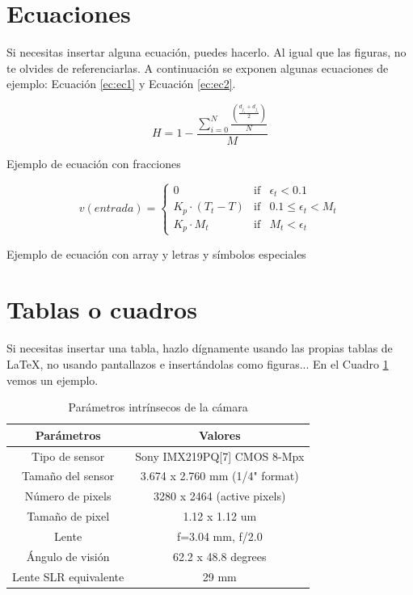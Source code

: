 \section{Ecuaciones}

Si necesitas insertar alguna ecuación, puedes hacerlo. Al igual que las figuras, no te olvides de referenciarlas. A continuación se exponen algunas ecuaciones de ejemplo: Ecuación \ref{ec:ec1} y Ecuación \ref{ec:ec2}.

\begin{myequation}[h]
\begin{equation}
H = 1 - \frac{\sum_{i=0}^{N}\frac{(\frac{d_{j_s} + d_{j_e}}{2})}{N}}{M}
\nonumber
\label{ec:ec1}
\end{equation}
\caption[Ejemplo de ecuación con fracciones]{Ejemplo de ecuación con fracciones}
\end{myequation} 

\begin{myequation}[h]
\begin{equation}
v(entrada)= \left\{
	\begin{array}{lcc}
		0 & \mbox{if} & \epsilon_t < 0.1\\
		K_p\cdot{(T_{t}-T)} & \mbox{if}& 0.1 \leq \epsilon_t < M_t\\
		K_p \cdot M_t & \mbox{if}& M_t < \epsilon_t
	\end{array}
\right.
\label{ec:ec2}
\end{equation}
\caption[Ejemplo de ecuación con array y letras y símbolos especiales]{Ejemplo de ecuación con array y letras y símbolos especiales}
\end{myequation}

\section{Tablas o cuadros}

Si necesitas insertar una tabla, hazlo dígnamente usando las propias tablas de \LaTeX, no usando pantallazos e insertándolas como figuras... En el Cuadro \ref{cuadro:ejemplo} vemos un ejemplo.

\begin{table}[H]
\begin{center}
\begin{tabular}{|c|c|}
\hline
\textbf{Parámetros} & \textbf{Valores} \\
\hline
Tipo de sensor & Sony IMX219PQ[7] CMOS 8-Mpx \\
Tamaño del sensor & 3.674 x 2.760 mm (1/4" format) \\
Número de pixels & 3280 x 2464 (active pixels) \\
Tamaño de pixel & 1.12 x 1.12 um \\
Lente & f=3.04 mm, f/2.0 \\
Ángulo de visión & 62.2 x 48.8 degrees \\
Lente SLR equivalente & 29 mm \\
\hline
\end{tabular}
\caption{Parámetros intrínsecos de la cámara}
\label{cuadro:ejemplo}
\end{center}
\end{table}

